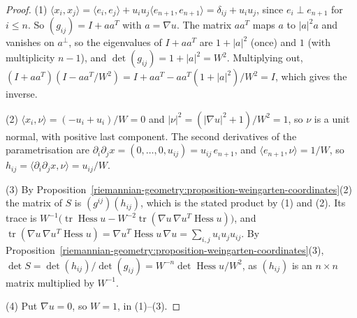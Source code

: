 \begin{proof}
(1) $\langle x_i, x_j\rangle = \langle e_i, e_j\rangle + u_iu_j\langle e_{n+1}, e_{n+1}\rangle = \delta_{ij} + u_iu_j$, since $e_i \perp e_{n+1}$ for $i \leq n$. So $(g_{ij}) = I + aa^T$ with $a = \nabla u$. The
matrix $aa^T$ maps $a$ to $|a|^2a$ and vanishes on $a^\perp$, so the eigenvalues of $I + aa^T$ are $1 + |a|^2$ (once) and $1$ (with multiplicity $n - 1$), and $\det(g_{ij}) = 1 + |a|^2 = W^2$. Multiplying
out, $(I + aa^T)(I - aa^T/W^2) = I + aa^T - aa^T(1 + |a|^2)/W^2 = I$, which gives the inverse.

(2) $\langle x_i, \nu\rangle = (-u_i + u_i)/W = 0$ and $|\nu|^2 = (|\nabla u|^2 + 1)/W^2 = 1$, so $\nu$ is a unit normal, with positive last component. The second derivatives of the parametrisation are
$\partial_i\partial_jx = (0, \ldots, 0, u_{ij}) = u_{ij}\,e_{n+1}$, and $\langle e_{n+1}, \nu\rangle = 1/W$, so $h_{ij} = \langle\partial_i\partial_jx, \nu\rangle = u_{ij}/W$.

(3) By Proposition~\ref{riemannian-geometry:proposition-weingarten-coordinates}(2) the matrix of $S$ is $(g^{ij})(h_{ij})$, which is the stated product by (1) and (2). Its trace is
$W^{-1}\bigl(\operatorname{tr}\operatorname{Hess}u - W^{-2}\operatorname{tr}(\nabla u\,\nabla u^T\operatorname{Hess}u)\bigr)$, and $\operatorname{tr}(\nabla u\,\nabla u^T\operatorname{Hess}u) = \nabla u^T\operatorname{Hess}u\,\nabla u = \sum_{i,j}u_iu_ju_{ij}$.
By Proposition~\ref{riemannian-geometry:proposition-weingarten-coordinates}(3), $\det S = \det(h_{ij})/\det(g_{ij}) = W^{-n}\det\operatorname{Hess}u/W^2$, as $(h_{ij})$ is an $n \times n$ matrix multiplied by $W^{-1}$.

(4) Put $\nabla u = 0$, so $W = 1$, in (1)--(3).
\end{proof}

